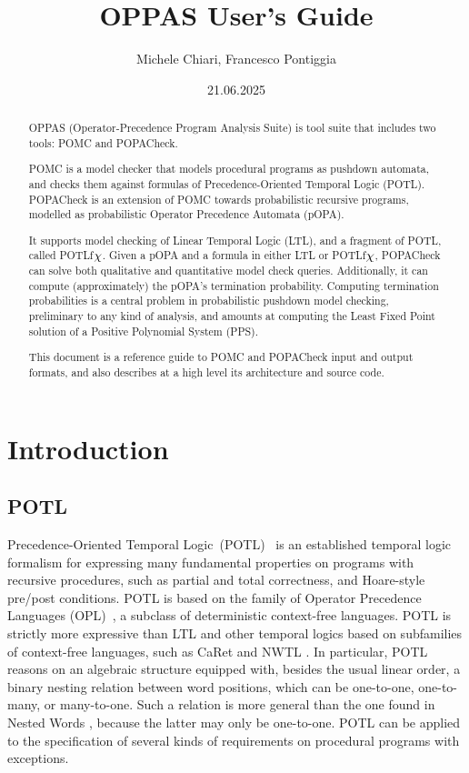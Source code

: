\documentclass[9pt,a4paper]{article}
\title{OPPAS User's Guide}
\author{Michele Chiari, Francesco Pontiggia}
\date{21.06.2025}
\begin{document}
\maketitle


\begin{abstract}
OPPAS (Operator-Precedence Program Analysis Suite) is tool suite that includes two tools: POMC and POPACheck.

POMC is a model checker that models procedural programs as pushdown automata,
and checks them against formulas of Precedence-Oriented Temporal Logic (POTL).
POPACheck is an extension of POMC towards probabilistic recursive programs, modelled as probabilistic Operator Precedence Automata (pOPA).

It supports model checking of Linear Temporal Logic (LTL), and a fragment of POTL, called POTLf$\chi$.
Given a pOPA and a formula in either LTL or POTLf$\chi$, POPACheck can solve both qualitative and quantitative model check queries.
Additionally, it can compute (approximately) the pOPA's termination probability.
Computing termination probabilities is a central problem in probabilistic pushdown model checking,
 preliminary to any kind of analysis, and amounts at computing the Least Fixed Point solution of a Positive Polynomial System (PPS).

This document is a reference guide to POMC and POPACheck input and output formats,
and also describes at a high level its architecture and source code.
\end{abstract}

\section{Introduction}

\subsection{POTL}

Precedence-Oriented Temporal Logic~(POTL)~\cite{ChiariMP21,ChiariMP21b} is an established temporal
logic formalism for expressing many fundamental properties on programs with recursive procedures,
such as partial and total correctness, and Hoare-style pre/post conditions.
POTL is based on the family of Operator Precedence Languages (OPL)~\cite{MP18},
a subclass of deterministic context-free languages.
POTL is strictly more expressive than LTL and other temporal logics based
on subfamilies of context-free languages, such as CaRet \cite{AlurEM04}
and NWTL \cite{lmcs/AlurABEIL08}.
In particular, POTL reasons on an algebraic structure equipped with,
besides the usual linear order, a binary nesting relation between word positions,
which can be one-to-one, one-to-many, or many-to-one.
Such a relation is more general than the one found in Nested Words \cite{jacm/AlurM09},
because the latter may only be one-to-one.
POTL can be applied to the specification of several kinds of requirements
on procedural programs with exceptions.
\end{document}
